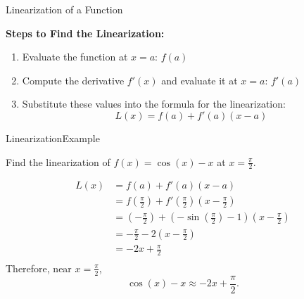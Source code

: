 \documentclass[10pt]{beamer}
\begin{document}
\begin{frame}{Linearization of a Function}

    \vspace{0.3cm}
    {}
    
    \vspace{0.5cm}
    \textbf{Steps to Find the Linearization:}
    \begin{enumerate}
        \item Evaluate the function at \( x = a \): \quad \( f(a) \)
        \item Compute the derivative \( f'(x) \) and evaluate it at \( x = a \): \quad \( f'(a) \)
        \item Substitute these values into the formula for the linearization:
        \[
        L(x) = f(a) + f'(a)(x - a)
        \]
    \end{enumerate}
\end{frame}
\begin{frame}{Linearization}{Example}
    \begin{example}
    Find the linearization of \( f(x) = \cos(x)-x \) at \( x = \frac{\pi}{2} \).
    \end{example}
    \begin{align*}
        L(x) &= f(a) + f'(a)(x - a)\\
         &= f\left(\frac{\pi}{2}\right) + f'\left(\frac{\pi}{2}\right)(x-\frac{\pi}{2})\\
         &= \left(-\frac{\pi}{2}\right) +\left(-\sin\left(\frac{\pi}{2}\right)-1\right)(x-\frac{\pi}{2})\\
         &= -\frac{\pi}{2}- 2(x-\frac{\pi}{2})\\
         &= - 2x + \frac{\pi}{2}\\
    \end{align*}
Therefore, near $x=\frac{\pi}{2}$,
\[
\cos(x)-x \approx -2x+\frac{\pi}{2}.
\]
\end{frame}
        
\end{document}
